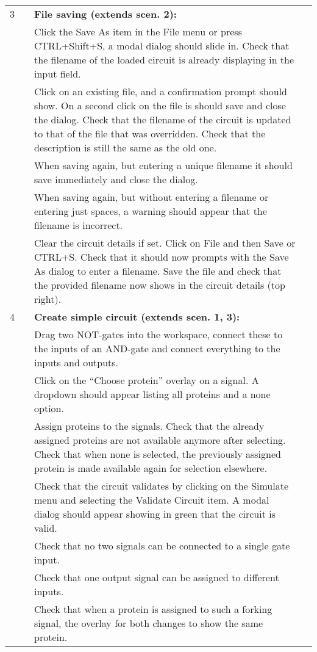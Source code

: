 \documentclass{article}
\newcounter{step}
\newcommand{\step}{\arabic{step}\stepcounter{step}}
\begin{document}
\begin{center}
\begin{longtable}{r r  p{} l }
3 & & \textbf{File saving (extends scen. 2):}\\
&\step& Click the Save As item in the File menu or press CTRL+Shift+S, a modal dialog should slide in. Check that the filename of the loaded circuit is already displaying in the input field.\\
&\step& Click on an existing file, and a confirmation prompt should show.
On a second click on the file is should save and close the dialog. Check that the filename of the circuit is updated to that of the file that was overridden. Check that the description is still the same as the old one.\\
&\step& When saving again, but entering a unique filename it should save immediately and close the dialog.\\
&\step& When saving again, but without entering a filename or entering just spaces, a warning should appear that the filename is incorrect.\\
&\step& Clear the circuit details if set. Click on File and then Save or CTRL+S. Check that it should now prompts with the Save As dialog to enter a filename. Save the file and check that the provided filename now shows in the circuit details (top right).\\ \midrule

4 &\setcounter{step}{1}& \textbf{Create simple circuit (extends scen. 1, 3):}\\
&\step& Drag two NOT-gates into the workspace, connect these to the inputs of an AND-gate and connect everything to the inputs and outputs.\\
&\step& Click on the ``Choose protein'' overlay on a signal. A dropdown should appear listing all proteins and a none option.\\
&\step& Assign proteins to the signals. Check that the already assigned proteins are not available anymore after selecting. Check that when none is selected, the previously assigned protein is made available again for selection elsewhere.\\
&\step& Check that the circuit validates by clicking on the Simulate menu and selecting the Validate Circuit item. A modal dialog should appear showing in green that the circuit is valid.\\
&\step& Check that no two signals can be connected to a single gate input.\\
&\step& Check that one output signal can be assigned to different inputs.\\
&\step& Check that when a protein is assigned to such a forking signal, the overlay for both changes to show the same protein.\\ \midrule


\end{longtable}
\end{center}
\end{document}
